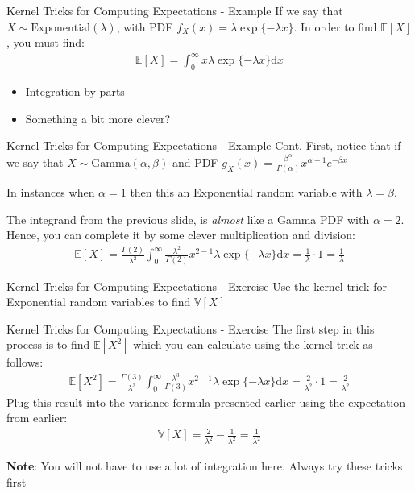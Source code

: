 \documentclass{beamer}
\begin{document}
\begin{frame}{Kernel Tricks for Computing Expectations - Example}
If we say that $X\sim\mathrm{Exponential}(\lambda)$, with PDF $f_{X}(x) = \lambda\exp\{-\lambda x\}$. In order to find $\mathbb{E}[X]$, you must find:
\begin{align*}
\mathbb{E}[X] = \int_{0}^{\infty} x\lambda\exp\{-\lambda x\} \mathrm{d}x
\end{align*}
\begin{itemize}
\item{Integration by parts}
\item{Something a bit more clever?}
\end{itemize}
\end{frame}

\begin{frame}{Kernel Tricks for Computing Expectations - Example Cont.}
First, notice that if we say that $X\sim\mathrm{Gamma}(\alpha, \beta)$ and PDF $g_{X}(x) = \frac{\beta^{\alpha}}{\Gamma(\alpha)} x^{\alpha - 1} e^{-\beta x}$
\newline

In instances when $\alpha = 1$ then this an Exponential random variable with $\lambda = \beta$. 
\newline 

The integrand from the previous slide, is \emph{almost} like a Gamma PDF with $\alpha = 2$. Hence, you can complete it by some clever multiplication and division:
\begin{align*}
\mathbb{E}[X] = \frac{\Gamma(2)}{\lambda^{2}}\int_{0}^{\infty}\frac{\lambda^{2}}{\Gamma(2)} x^{2-1}\lambda\exp\{-\lambda x\} \mathrm{d}x = \frac{1}{\lambda} \cdot 1 = \frac{1}{\lambda}
\end{align*}
\end{frame}

\begin{frame}{Kernel Tricks for Computing Expectations - Exercise}
Use the kernel trick for Exponential random variables to find $\mathbb{V}[X]$
\end{frame}


\begin{frame}{Kernel Tricks for Computing Expectations - Exercise}
The first step in this process is to find $\mathbb{E}[X^{2}]$ which you can calculate using the kernel trick as follows:
\begin{align*}
\mathbb{E}[X^{2}] = \frac{\Gamma(3)}{\lambda^{3}}\int_{0}^{\infty}\frac{\lambda^{3}}{\Gamma(3)} x^{2-1}\lambda\exp\{-\lambda x\} \mathrm{d}x = \frac{2}{\lambda^{2}} \cdot 1 = \frac{2}{\lambda^{2}}
\end{align*}
Plug this result into the variance formula presented earlier using the expectation from earlier:
\begin{align*}
\mathbb{V}[X] = \frac{2}{\lambda^{2}} - \frac{1}{\lambda^{2}} = \frac{1}{\lambda^{2}}
\end{align*}

\textbf{Note}: You will not have to use a lot of integration here. Always try these tricks first
\end{frame}
\end{document}
